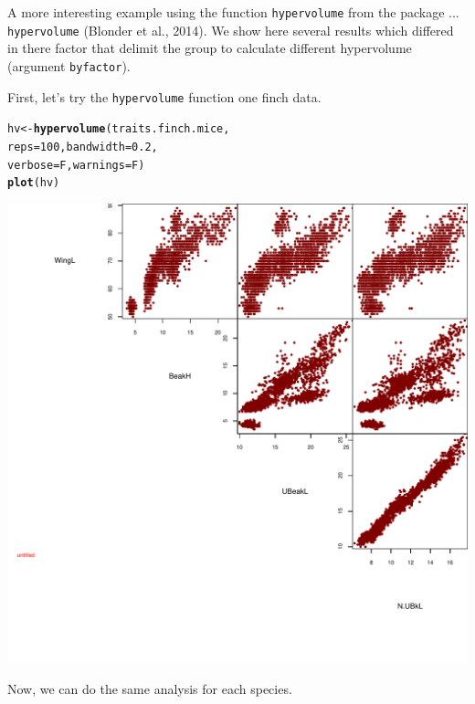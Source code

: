 \documentclass[12pt]{article}\usepackage[]{graphicx}\usepackage[]{color}
\makeatletter
\def\maxwidth{ %
  \ifdim\Gin@nat@width>\linewidth
    \linewidth
  \else
    \Gin@nat@width
  \fi
}
\newcommand{\hlnum}[1]{\textcolor[rgb]{0.686,0.059,0.569}{#1}}%
\newcommand{\hlstd}[1]{\textcolor[rgb]{0.345,0.345,0.345}{#1}}%
\newcommand{\hlkwb}[1]{\textcolor[rgb]{0.69,0.353,0.396}{#1}}%
\newcommand{\hlkwc}[1]{\textcolor[rgb]{0.333,0.667,0.333}{#1}}%
\newcommand{\hlkwd}[1]{\textcolor[rgb]{0.737,0.353,0.396}{\textbf{#1}}}%
\newenvironment{kframe}{%
 \def\at@end@of@kframe{}%
 \ifinner\ifhmode%
  \def\at@end@of@kframe{\end{minipage}}%
  \begin{minipage}{\columnwidth}%
 \fi\fi%
 \def\FrameCommand##1{\hskip\@totalleftmargin \hskip-\fboxsep
 \colorbox{shadecolor}{##1}\hskip-\fboxsep
     \hskip-\linewidth \hskip-\@totalleftmargin \hskip\columnwidth}%
 \MakeFramed {\advance\hsize-\width
   \@totalleftmargin\z@ \linewidth\hsize
   \@setminipage}}%
 {\par\unskip\endMakeFramed%
 \at@end@of@kframe}
\newenvironment{knitrout}{}{} %
\makeatother
\begin{document}
\newpage
A more interesting example using the function \texttt{hypervolume} from the package ... \texttt{hypervolume} (Blonder et al., 2014). We show here several results which differed in there factor that delimit the group to calculate different hypervolume (argument \texttt{byfactor}). 

First, let's try the \texttt{hypervolume} function one finch data.
\begin{knitrout}
\color{fgcolor}\begin{kframe}
\begin{alltt}
\hlstd{hv}\hlkwb{<-}\hlkwd{hypervolume}\hlstd{(traits.finch.mice,}
        \hlkwc{reps} \hlstd{=} \hlnum{100}\hlstd{,}\hlkwc{bandwidth} \hlstd{=} \hlnum{0.2}\hlstd{,}
        \hlkwc{verbose} \hlstd{= F,} \hlkwc{warnings} \hlstd{= F)}
\hlkwd{plot}\hlstd{(hv)}
\end{alltt}
\end{kframe}
\includegraphics[width=\maxwidth]{figure/unnamed-chunk-53} 

\end{knitrout}

Now, we can do the same analysis for each species.
\end{document}
